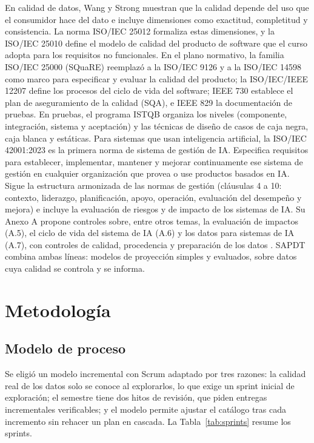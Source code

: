 \documentclass[conference]{IEEEtran}
\begin{document}
En calidad de datos, Wang y Strong \cite{wang1996} muestran que la calidad depende del uso que el consumidor hace del dato e incluye dimensiones como exactitud, completitud y consistencia. La norma ISO/IEC 25012 \cite{iso25012} formaliza estas dimensiones, y la ISO/IEC 25010 \cite{iso25010} define el modelo de calidad del producto de software que el curso adopta para los requisitos no funcionales. En el plano normativo, la familia ISO/IEC 25000 (SQuaRE) reemplazó a la ISO/IEC 9126 y a la ISO/IEC 14598 como marco para especificar y evaluar la calidad del producto; la ISO/IEC/IEEE 12207 \cite{iso12207} define los procesos del ciclo de vida del software; IEEE 730 \cite{ieee730} establece el plan de aseguramiento de la calidad (SQA), e IEEE 829 \cite{ieee829} la documentación de pruebas. En pruebas, el programa ISTQB \cite{istqb2023} organiza los niveles (componente, integración, sistema y aceptación) y las técnicas de diseño de casos de caja negra, caja blanca y estáticas. Para sistemas que usan inteligencia artificial, la ISO/IEC 42001:2023 \cite{iso42001} es la primera norma de sistema de gestión de IA. Especifica requisitos para establecer, implementar, mantener y mejorar continuamente ese sistema de gestión en cualquier organización que provea o use productos basados en IA. Sigue la estructura armonizada de las normas de gestión (cláusulas 4 a 10: contexto, liderazgo, planificación, apoyo, operación, evaluación del desempeño y mejora) e incluye la evaluación de riesgos y de impacto de los sistemas de IA. Su Anexo A propone controles sobre, entre otros temas, la evaluación de impactos (A.5), el ciclo de vida del sistema de IA (A.6) y los datos para sistemas de IA (A.7), con controles de calidad, procedencia y preparación de los datos \cite{iso42001,modulos42001}. SAPDT combina ambas líneas: modelos de proyección simples y evaluados, sobre datos cuya calidad se controla y se informa.

\section{Metodología}\label{sec:metodologia}
\subsection{Modelo de proceso}
Se eligió un modelo incremental con Scrum adaptado \cite{scrum2020,sommerville2011} por tres razones: la calidad real de los datos solo se conoce al explorarlos, lo que exige un sprint inicial de exploración; el semestre tiene dos hitos de revisión, que piden entregas incrementales verificables; y el modelo permite ajustar el catálogo tras cada incremento sin rehacer un plan en cascada. La Tabla~\ref{tab:sprints} resume los sprints.
\end{document}
